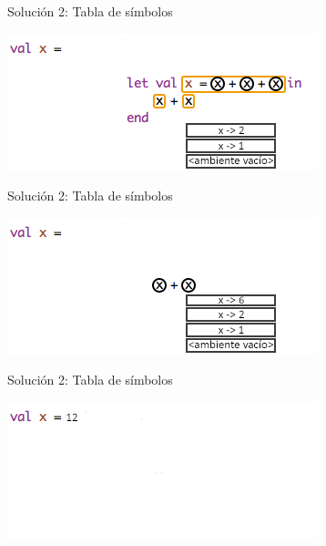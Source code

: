 \documentclass{beamer} %
\begin{document}
\begin{frame}{Solución 2: Tabla de símbolos}
    \begin{center}
        \includegraphics[width=.9\textwidth]{./image/cap5/scope-b04}
    \end{center}
\end{frame}

\begin{frame}{Solución 2: Tabla de símbolos}
    \begin{center}
        \includegraphics[width=.9\textwidth]{./image/cap5/scope-b05}
    \end{center}
\end{frame}

\begin{frame}{Solución 2: Tabla de símbolos}
    \begin{center}
        \includegraphics[width=.9\textwidth]{./image/cap5/scope06}
    \end{center}
\end{frame}
\end{document}
